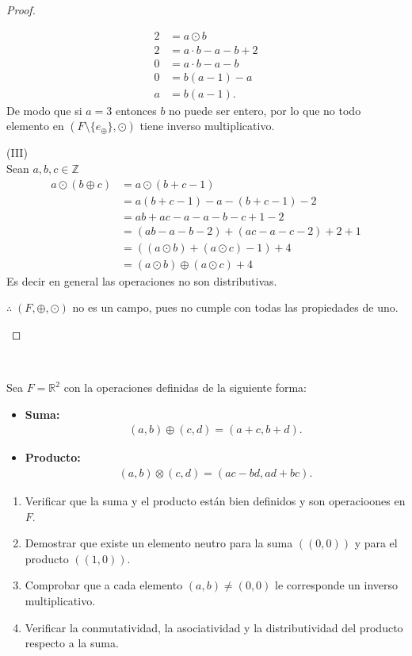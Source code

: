 \documentclass[11pt,letterpaper]{article}
\newcommand{\R}{\mathbb{R}}
\newcommand{\Z}{\mathbb{Z}}
\begin{document}
\begin{proof}
\begin{tcolorbox}
	\begin{align*}
		2&=a\odot b\\
		2&=a\cdot b-a-b+2\\
		0&=a\cdot b-a-b\\
		0&=b(a-1)-a\\
		a&=b(a-1).
	\end{align*}
	De modo que si $a=3$ entonces $b$ no puede ser entero, por lo que no todo elemento en $(F\setminus\{e_\oplus\},\odot)$ tiene inverso multiplicativo.
\end{tcolorbox}
\begin{tcolorbox}
	(III)\\
	Sean $a,b,c\in\Z$
	\begin{align*}
	 a\odot(b\oplus c)&=a\odot(b+c-1)\\
	 &=a(b+c-1)-a-(b+c-1)-2\\
	 &=ab+ac-a-a-b-c+1-2\\
	 &=(ab-a-b-2)+(ac-a-c-2)+2+1\\
	 &=((a\odot b)+(a\odot c)-1)+4\\
	 &=(a\odot b)\oplus (a\odot c)+4
	\end{align*}
	Es decir en general las operaciones no son distributivas.
\end{tcolorbox}
\begin{tcolorbox}
	$\therefore\; (F,\oplus,\odot)$ no es un campo, pues no cumple con todas las propiedades de uno.
\end{tcolorbox}
\end{proof}\,\\
\begin{tcolorbox}[
	title = \textcolor{black}{\textcolor{white}{Problema 5}},]
Sea $F=\R^2$ con la operaciones definidas de la siguiente forma:\\
	\begin{itemize}
		\item \textbf{Suma:}
		\begin{align*}
			(a,b)\oplus(c,d)=(a+c,b+d).
		\end{align*}
		\item \textbf{Producto:}
		\begin{align*}
			(a,b)\otimes(c,d)=(ac-bd,ad+bc).
		\end{align*}
	\end{itemize}

	\begin{enumerate}
		\item Verificar que la suma y el producto están bien definidos y son operacioones en $F$.
		\item Demostrar que existe un elemento neutro para la suma $((0, 0))$ y para el producto
		$((1, 0))$.
		\item Comprobar que a cada elemento $(a, b)\neq(0, 0)$ le corresponde un inverso multiplicativo.
		\item Verificar la conmutatividad, la asociatividad y la distributividad del producto 
		respecto a la suma.
	\end{enumerate}
\end{tcolorbox}\,\\\,\\
\end{document}
